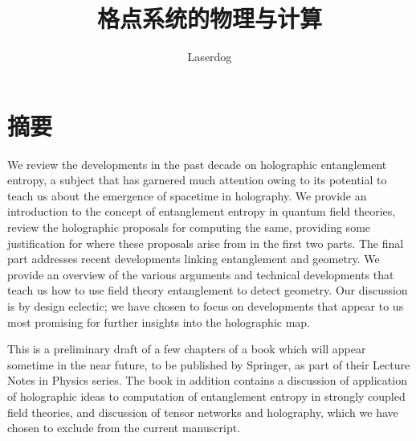 \documentclass[12pt,openany]{book}
\title{{\bf \Huge 格点系统的物理与计算}}
\author{\normalsize
Laserdog}
\begin{document}
\setlength{\baselineskip}{16pt}
\begin{titlepage}
\maketitle

\thispagestyle{empty}
\setcounter{page}{0}
\end{titlepage}

\renewcommand{\thefootnote}{\arabic{footnote}}

\frontmatter


\chapter{摘要}

We review the developments in the past decade on holographic entanglement entropy, a subject that has garnered much attention owing to its potential to teach us about the emergence of spacetime in holography. 
We provide  an introduction to the concept of entanglement entropy in quantum field theories, review the holographic proposals for computing the same, providing some justification for where these proposals arise from in the first two parts. The final part addresses recent developments linking entanglement and geometry. We provide an overview of the various arguments and technical developments that teach us how to use field theory entanglement to detect geometry. Our discussion is by design eclectic; we have chosen to focus on developments that appear to us most promising for further insights into the holographic map. 

This is a preliminary draft of a few chapters of a book which will appear sometime in the near future, to be published by Springer, as part of their Lecture Notes in Physics series. The book in addition contains a discussion of application of holographic ideas to computation of entanglement entropy in strongly coupled field theories, and discussion of tensor networks and holography, which we have chosen to exclude from the current manuscript. 
\end{document}
